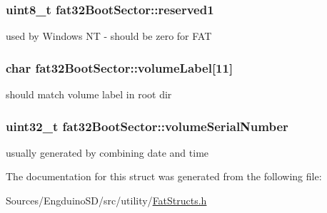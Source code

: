 \subsubsection[{reserved1}]{\setlength{\rightskip}{0pt plus 5cm}uint8\+\_\+t fat32\+Boot\+Sector\+::reserved1}\label{structfat32_boot_sector_a0a59c59a3f18c1117ffc6a0c25295b9c}
used by Windows N\+T -\/ should be zero for F\+A\+T \hypertarget{structfat32_boot_sector_a327d3769a6a9d172cec163cda30a35ee}{}
\subsubsection[{volume\+Label}]{\setlength{\rightskip}{0pt plus 5cm}char fat32\+Boot\+Sector\+::volume\+Label\mbox{[}11\mbox{]}}\label{structfat32_boot_sector_a327d3769a6a9d172cec163cda30a35ee}
should match volume label in root dir \hypertarget{structfat32_boot_sector_aa4dffa8748097e02373c33d5f1957b1e}{}
\subsubsection[{volume\+Serial\+Number}]{\setlength{\rightskip}{0pt plus 5cm}uint32\+\_\+t fat32\+Boot\+Sector\+::volume\+Serial\+Number}\label{structfat32_boot_sector_aa4dffa8748097e02373c33d5f1957b1e}
usually generated by combining date and time 

The documentation for this struct was generated from the following file\+:\begin{DoxyCompactItemize}
\item 
Sources/\+Engduino\+S\+D/src/utility/\hyperlink{_fat_structs_8h}{Fat\+Structs.\+h}\end{DoxyCompactItemize}
